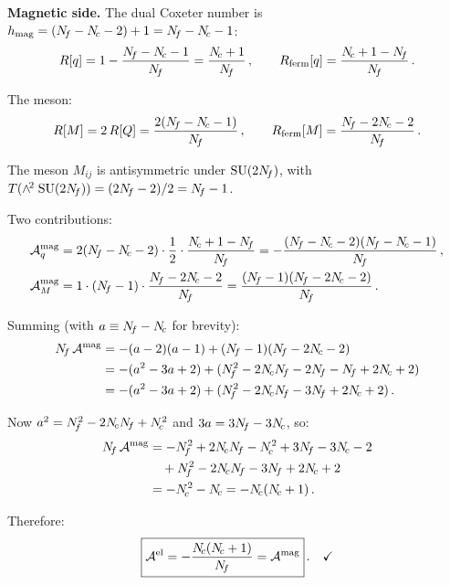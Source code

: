 \documentclass[11pt,a4paper]{article}
\begin{document}
\textbf{Magnetic side.}
The dual Coxeter number is $h_{\text{mag}} = (N_{\!f} - N_{\!c} - 2) + 1
= N_{\!f} - N_{\!c} - 1$:
\begin{equation}\label{eq:Sp-Rmag}
  R[q] = 1 - \frac{\Nf - \Nc - 1}{\Nf}
  = \frac{\Nc + 1}{\Nf}\,,
  \qquad
  R_{\text{ferm}}[q] = \frac{\Nc + 1 - \Nf}{\Nf}\,.
\end{equation}

The meson:
\begin{equation}\label{eq:Sp-RM}
  R[M] = 2\,R[Q] = \frac{2(N_{\!f} - N_{\!c} - 1)}{N_{\!f}}\,,
  \qquad
  R_{\text{ferm}}[M] = \frac{N_{\!f} - 2N_{\!c} - 2}{N_{\!f}}\,.
\end{equation}

The meson $M_{ij}$ is antisymmetric under $\mathrm{SU}(2N_{\!f})$, with
$T(\wedge^{\!2}\; \mathrm{SU}(2N_{\!f})) = (2N_{\!f} - 2)/2 = N_{\!f} - 1$.

Two contributions:
\begin{align}
  \mathcal{A}^{\text{mag}}_q
  &= 2(\Nf - \Nc - 2) \cdot \frac{1}{2}
    \cdot \frac{\Nc + 1 - \Nf}{\Nf}
  = -\frac{(\Nf - \Nc - 2)(\Nf - \Nc - 1)}{\Nf}\,,
  \label{eq:Sp-Amag-q} \\
  \mathcal{A}^{\text{mag}}_M
  &= 1 \cdot (\Nf - 1) \cdot \frac{\Nf - 2\Nc - 2}{\Nf}
  = \frac{(\Nf - 1)(\Nf - 2\Nc - 2)}{\Nf}\,.
  \label{eq:Sp-Amag-M}
\end{align}

Summing (with $a \equiv N_{\!f} - N_{\!c}$ for brevity):
\begin{align}
  \Nf\, \mathcal{A}^{\text{mag}}
  &= -(a-2)(a-1) + (\Nf - 1)(\Nf - 2\Nc - 2) \notag \\
  &= -(a^2 - 3a + 2)
    + (\Nf^2 - 2\Nc\Nf - 2\Nf - \Nf + 2\Nc + 2) \notag \\
  &= -(a^2 - 3a + 2)
    + (\Nf^2 - 2\Nc\Nf - 3\Nf + 2\Nc + 2)\,.
  \label{eq:Sp-expand}
\end{align}

Now $a^2 = N_{\!f}^2 - 2N_{\!c}N_{\!f} + N_{\!c}^2$ and
$3a = 3N_{\!f} - 3N_{\!c}$, so:
\begin{align}
  \Nf\, \mathcal{A}^{\text{mag}}
  &= -\Nf^2 + 2\Nc\Nf - \Nc^2 + 3\Nf - 3\Nc - 2
    \notag \\
  &\quad + \Nf^2 - 2\Nc\Nf - 3\Nf + 2\Nc + 2 \notag \\
  &= -\Nc^2 - \Nc = -\Nc(\Nc + 1)\,.
  \label{eq:Sp-Amag-result}
\end{align}

Therefore:
\begin{equation}\label{eq:Sp-anomaly-match}
  \boxed{\mathcal{A}^{\text{el}}
    = -\frac{N_{\!c}(N_{\!c} + 1)}{N_{\!f}}
    = \mathcal{A}^{\text{mag}}}\,.
  \quad\checkmark
\end{equation}
\end{document}
